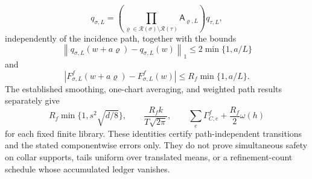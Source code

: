 \[
q_{\sigma,L}
=
\left(
\prod_{\varrho\in\mathscr R(\sigma)\setminus\mathscr R(\tau)}
\mathsf A_{\varrho,L}
\right)q_{\tau,L},
\]
independently of the incidence path, together with the bounds
\[
\left\|q_{\sigma,L}(w+a\varrho)-q_{\sigma,L}(w)\right\|_1
\leq 2\min\{1,a/L\}
\]
and
\[
\left|F^f_{\sigma,L}(w+a\varrho)-F^f_{\sigma,L}(w)\right|
\leq R_f\min\{1,a/L\}.
\]
The established smoothing, one-chart averaging, and weighted path results separately give
\[
R_f\min\{1,s^2\sqrt{d/8}\},
\qquad
\frac{R_fk}{T\sqrt{2\pi}},
\qquad
\sum_e\Gamma_{C,e}^f+\frac{R_f}{2}\omega(h)
\]
for each fixed finite library. These identities certify path-independent transitions and the stated componentwise errors only. They do not prove simultaneous safety on collar supports, tails uniform over translated means, or a refinement-count schedule whose accumulated ledger vanishes.

